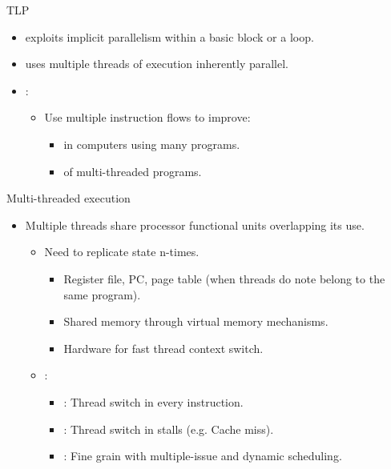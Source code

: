 \begin{frame}[t]{TLP}
\begin{itemize}
  \item {} 
        exploits implicit parallelism within a basic block or a loop.

  \item {} 
        uses multiple threads of execution inherently parallel.

  \item {}:
    \begin{itemize}
      \item Use multiple instruction flows to improve:
        \begin{itemize}
          \item {} 
                in computers using many programs.
          \item {} 
                of multi-threaded programs.
        \end{itemize}
    \end{itemize}
\end{itemize}
\end{frame}

\begin{frame}[t]{Multi-threaded execution}
\begin{itemize}
  \item Multiple threads share processor functional units overlapping its use.
    \begin{itemize}
      \item Need to replicate state n-times.
        \begin{itemize}
          \item Register file, PC, page table (when threads do note belong to the same program).
          \item Shared memory through virtual memory mechanisms.
          \item Hardware for fast thread context switch.
        \end{itemize}

      \item {}:
        \begin{itemize}
          \item {}: Thread switch in every instruction.
          \item {}: Thread switch in stalls (e.g. Cache miss).
          \item {}: Fine grain with multiple-issue and dynamic scheduling.
        \end{itemize}
    \end{itemize}
\end{itemize}
\end{frame}

